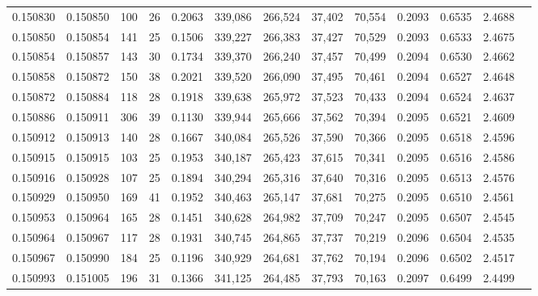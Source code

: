 \begin{tabular}{rrrrrrrrrrrrr}
0.150830 & 0.150850 &   100 &  26 &                                     0.2063 & 339,086 & 266,524 &  37,402 &  70,554 & 0.2093 & 0.6535 & 2.4688 \\
0.150850 & 0.150854 &   141 &  25 &                                     0.1506 & 339,227 & 266,383 &  37,427 &  70,529 & 0.2093 & 0.6533 & 2.4675 \\
0.150854 & 0.150857 &   143 &  30 &                                     0.1734 & 339,370 & 266,240 &  37,457 &  70,499 & 0.2094 & 0.6530 & 2.4662 \\
0.150858 & 0.150872 &   150 &  38 &                                     0.2021 & 339,520 & 266,090 &  37,495 &  70,461 & 0.2094 & 0.6527 & 2.4648 \\
0.150872 & 0.150884 &   118 &  28 &                                     0.1918 & 339,638 & 265,972 &  37,523 &  70,433 & 0.2094 & 0.6524 & 2.4637 \\
0.150886 & 0.150911 &   306 &  39 &                                     0.1130 & 339,944 & 265,666 &  37,562 &  70,394 & 0.2095 & 0.6521 & 2.4609 \\
0.150912 & 0.150913 &   140 &  28 &                                     0.1667 & 340,084 & 265,526 &  37,590 &  70,366 & 0.2095 & 0.6518 & 2.4596 \\
0.150915 & 0.150915 &   103 &  25 &                                     0.1953 & 340,187 & 265,423 &  37,615 &  70,341 & 0.2095 & 0.6516 & 2.4586 \\
0.150916 & 0.150928 &   107 &  25 &                                     0.1894 & 340,294 & 265,316 &  37,640 &  70,316 & 0.2095 & 0.6513 & 2.4576 \\
0.150929 & 0.150950 &   169 &  41 &                                     0.1952 & 340,463 & 265,147 &  37,681 &  70,275 & 0.2095 & 0.6510 & 2.4561 \\
0.150953 & 0.150964 &   165 &  28 &                                     0.1451 & 340,628 & 264,982 &  37,709 &  70,247 & 0.2095 & 0.6507 & 2.4545 \\
0.150964 & 0.150967 &   117 &  28 &                                     0.1931 & 340,745 & 264,865 &  37,737 &  70,219 & 0.2096 & 0.6504 & 2.4535 \\
0.150967 & 0.150990 &   184 &  25 &                                     0.1196 & 340,929 & 264,681 &  37,762 &  70,194 & 0.2096 & 0.6502 & 2.4517 \\
0.150993 & 0.151005 &   196 &  31 &                                     0.1366 & 341,125 & 264,485 &  37,793 &  70,163 & 0.2097 & 0.6499 & 2.4499 \\

\end{tabular}
